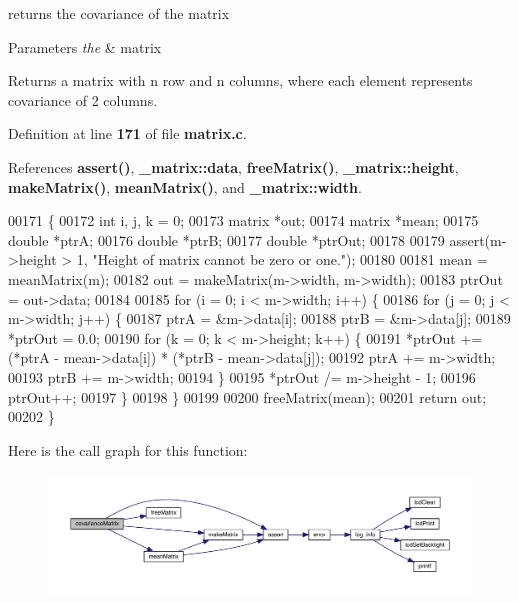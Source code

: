 returns the covariance of the matrix 


\begin{DoxyParams}{Parameters}
{\em the} & matrix \\
\hline
\end{DoxyParams}
\begin{DoxyReturn}{Returns}
a matrix with n row and n columns, where each element represents covariance of 2 columns. 
\end{DoxyReturn}


Definition at line \textbf{ 171} of file \textbf{ matrix.\+c}.



References \textbf{ assert()}, \textbf{ \+\_\+matrix\+::data}, \textbf{ free\+Matrix()}, \textbf{ \+\_\+matrix\+::height}, \textbf{ make\+Matrix()}, \textbf{ mean\+Matrix()}, and \textbf{ \+\_\+matrix\+::width}.


\begin{DoxyCode}
00171                                     \{
00172   \textcolor{keywordtype}{int} i, j, k = 0;
00173   matrix *out;
00174   matrix *mean;
00175   \textcolor{keywordtype}{double} *ptrA;
00176   \textcolor{keywordtype}{double} *ptrB;
00177   \textcolor{keywordtype}{double} *ptrOut;
00178 
00179   assert(m->height > 1, \textcolor{stringliteral}{"Height of matrix cannot be zero or one."});
00180 
00181   mean = meanMatrix(m);
00182   out = makeMatrix(m->width, m->width);
00183   ptrOut = out->data;
00184 
00185   \textcolor{keywordflow}{for} (i = 0; i < m->width; i++) \{
00186     \textcolor{keywordflow}{for} (j = 0; j < m->width; j++) \{
00187       ptrA = &m->data[i];
00188       ptrB = &m->data[j];
00189       *ptrOut = 0.0;
00190       \textcolor{keywordflow}{for} (k = 0; k < m->height; k++) \{
00191         *ptrOut += (*ptrA - mean->data[i]) * (*ptrB - mean->data[j]);
00192         ptrA += m->width;
00193         ptrB += m->width;
00194       \}
00195       *ptrOut /= m->height - 1;
00196       ptrOut++;
00197     \}
00198   \}
00199 
00200   freeMatrix(mean);
00201   \textcolor{keywordflow}{return} out;
00202 \}
\end{DoxyCode}
Here is the call graph for this function\+:
\nopagebreak
\begin{figure}[H]
\begin{center}
\leavevmode
\includegraphics[width=350pt]{matrix_8c_ae6dab569959c360cf165136a3b625edd_cgraph}
\end{center}
\end{figure}
\mbox{\label{matrix_8c_af49b525d7476c365833db9acd975e3a5}} 
